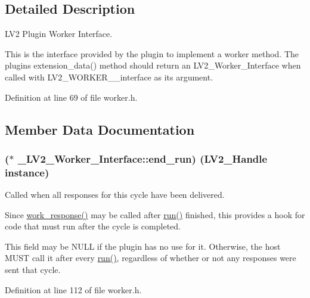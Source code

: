 \subsection{Detailed Description}
L\+V2 Plugin Worker Interface.

This is the interface provided by the plugin to implement a worker method. The plugin\textquotesingle{}s extension\+\_\+data() method should return an L\+V2\+\_\+\+Worker\+\_\+\+Interface when called with L\+V2\+\_\+\+W\+O\+R\+K\+E\+R\+\_\+\+\_\+interface as its argument. 

Definition at line 69 of file worker.\+h.



\subsection{Member Data Documentation}
\subsubsection[{\texorpdfstring{end\+\_\+run}{end_run}}]{($\ast$ \+\_\+\+L\+V2\+\_\+\+Worker\+\_\+\+Interface\+::end\+\_\+run) ({\bf L\+V2\+\_\+\+Handle} instance)}\hypertarget{struct___l_v2___worker___interface_a382139d28995ca0ee147fb89220f64bd}{}\label{struct___l_v2___worker___interface_a382139d28995ca0ee147fb89220f64bd}
Called when all responses for this cycle have been delivered.

Since \hyperlink{struct___l_v2___worker___interface_a4b3c69fccf0132cc5da461dacabdf4d6}{work\+\_\+response()} may be called after \hyperlink{namespacewaflib_1_1_task_a859c6336afe027ae782f84b9e49a4f0f}{run()} finished, this provides a hook for code that must run after the cycle is completed.

This field may be N\+U\+LL if the plugin has no use for it. Otherwise, the host M\+U\+ST call it after every \hyperlink{namespacewaflib_1_1_task_a859c6336afe027ae782f84b9e49a4f0f}{run()}, regardless of whether or not any responses were sent that cycle. 

Definition at line 112 of file worker.\+h.

